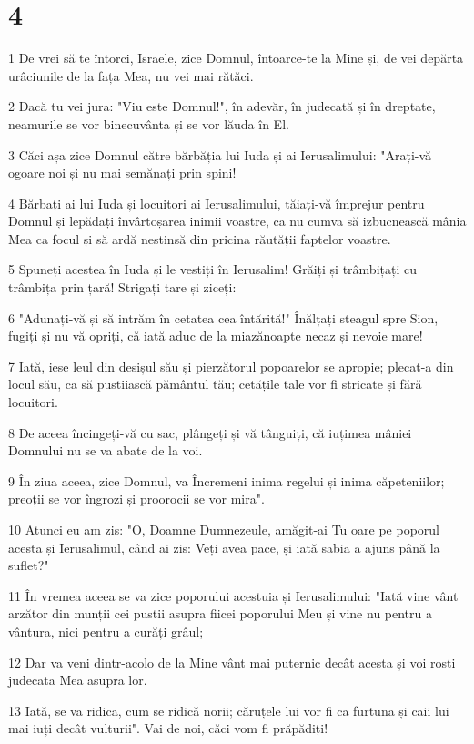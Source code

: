 \chapter{4}

\par 1 De vrei să te întorci, Israele, zice Domnul, întoarce-te la Mine și, de vei depărta urâciunile de la fața Mea, nu vei mai rătăci.
\par 2 Dacă tu vei jura: "Viu este Domnul!", în adevăr, în judecată și în dreptate, neamurile se vor binecuvânta și se vor lăuda în El.
\par 3 Căci așa zice Domnul către bărbăția lui Iuda și ai Ierusalimului: "Arați-vă ogoare noi și nu mai semănați prin spini!
\par 4 Bărbați ai lui Iuda și locuitori ai Ierusalimului, tăiați-vă împrejur pentru Domnul și lepădați învârtoșarea inimii voastre, ca nu cumva să izbucnească mânia Mea ca focul și să ardă nestinsă din pricina răutății faptelor voastre.
\par 5 Spuneți acestea în Iuda și le vestiți în Ierusalim! Grăiți și trâmbițați cu trâmbița prin țară! Strigați tare și ziceți:
\par 6 "Adunați-vă și să intrăm în cetatea cea întărită!" Înălțați steagul spre Sion, fugiți și nu vă opriți, că iată aduc de la miazănoapte necaz și nevoie mare!
\par 7 Iată, iese leul din desișul său și pierzătorul popoarelor se apropie; plecat-a din locul său, ca să pustiiască pământul tău; cetățile tale vor fi stricate și fără locuitori.
\par 8 De aceea încingeți-vă cu sac, plângeți și vă tânguiți, că iuțimea mâniei Domnului nu se va abate de la voi.
\par 9 În ziua aceea, zice Domnul, va Încremeni inima regelui și inima căpeteniilor; preoții se vor îngrozi și proorocii se vor mira".
\par 10 Atunci eu am zis: "O, Doamne Dumnezeule, amăgit-ai Tu oare pe poporul acesta și Ierusalimul, când ai zis: Veți avea pace, și iată sabia a ajuns până la suflet?"
\par 11 În vremea aceea se va zice poporului acestuia și Ierusalimului: "Iată vine vânt arzător din munții cei pustii asupra fiicei poporului Meu și vine nu pentru a vântura, nici pentru a curăți grâul;
\par 12 Dar va veni dintr-acolo de la Mine vânt mai puternic decât acesta și voi rosti judecata Mea asupra lor.
\par 13 Iată, se va ridica, cum se ridică norii; căruțele lui vor fi ca furtuna și caii lui mai iuți decât vulturii". Vai de noi, căci vom fi prăpădiți!
